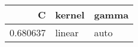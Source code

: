 \begin{tabular}{rll}
\toprule
C & kernel & gamma \\
\midrule
0.680637 & linear & auto \\
\bottomrule
\end{tabular}
